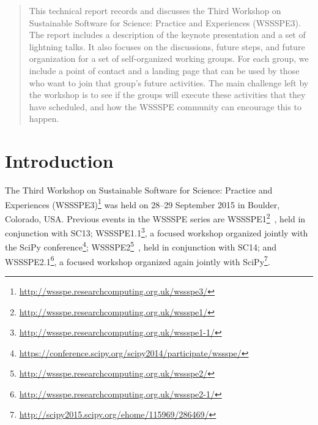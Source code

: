 \documentclass[11pt, oneside]{amsart}
\begin{document}
\begin{abstract}
This technical report records and discusses the Third Workshop on Sustainable
Software for Science: Practice and Experiences (WSSSPE3). 
The report includes a description of the keynote presentation and a set of lightning
talks. It also focuses on the discussions, future steps, and future organization for
a set of self-organized working groups.
For each group, we include a point of contact and a landing
page that can be used by those who want to join that group's future activities.
The main challenge left by the workshop is to see if the groups will execute 
these activities that they have scheduled, and how the WSSSPE community
can encourage this to happen.
\end{abstract}


\maketitle
\newpage

\section{Introduction} \label{sec:intro}

The Third Workshop on Sustainable Software for Science: Practice and Experiences
(WSSSPE3)\footnote{\url{http://wssspe.researchcomputing.org.uk/wssspe3/}} was
held on 28--29 September 2015 in Boulder, Colorado, USA. Previous events in the
WSSSPE series are
WSSSPE1\footnote{\url{http://wssspe.researchcomputing.org.uk/wssspe1/}}~\cite{WSSSPE1-pre-report,WSSSPE1},
held in conjunction with SC13;
WSSSPE1.1\footnote{\url{http://wssspe.researchcomputing.org.uk/wssspe1-1/}}, a
focused workshop organized jointly with the SciPy
conference\footnote{\url{https://conference.scipy.org/scipy2014/participate/wssspe/}};
WSSSPE2\footnote{\url{http://wssspe.researchcomputing.org.uk/wssspe2/}}~\cite{WSSSPE2-pre-report,WSSSPE2},
held in conjunction with SC14; and
WSSSPE2.1\footnote{\url{http://wssspe.researchcomputing.org.uk/wssspe2-1/}}, a
focused workshop organized again jointly with
SciPy\footnote{\url{http://scipy2015.scipy.org/ehome/115969/286469/}}.
\end{document}
